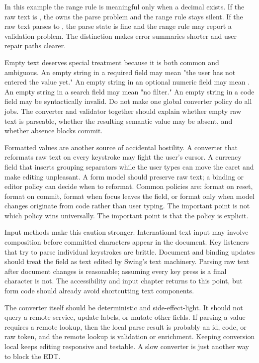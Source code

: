 In this example the range rule is meaningful only when a decimal exists. If the
raw text is , the  owns the parse problem and the
range rule stays silent. If the raw text parses to , the parse state is
fine and the range rule may report a validation problem. The distinction makes
error summaries shorter and user repair paths clearer.

Empty text deserves special treatment because it is both common and ambiguous.
An empty string in a required field may mean "the user has not entered the
value yet." An empty string in an optional numeric field may mean .
An empty string in a search field may mean "no filter." An empty string in a
code field may be syntactically invalid. Do not make one global converter
policy do all jobs. The converter and validator together should explain
whether empty raw text is parseable, whether the resulting semantic value may
be absent, and whether absence blocks commit.

Formatted values are another source of accidental hostility. A converter that
reformats raw text on every keystroke may fight the user's cursor. A currency
field that inserts grouping separators while the user types can move the caret
and make editing unpleasant. A form model should preserve raw text; a binding
or editor policy can decide when to reformat. Common policies are: format on
reset, format on commit, format when focus leaves the field, or format only
when model changes originate from code rather than user typing. The important
point is not which policy wins universally. The important point is that the
policy is explicit.

Input methods make this caution stronger. International text input may involve
composition before committed characters appear in the document. Key listeners
that try to parse individual keystrokes are brittle. Document and binding
updates should treat the field as text edited by Swing's text machinery.
Parsing raw text after document changes is reasonable; assuming every key press
is a final character is not. The accessibility and input chapter returns to
this point, but form code should already avoid shortcutting text components.

The converter itself should be deterministic and side-effect-light. It should
not query a remote service, update labels, or mutate other fields. If parsing a
value requires a remote lookup, then the local parse result is probably an id,
code, or raw token, and the remote lookup is validation or enrichment. Keeping
conversion local keeps editing responsive and testable. A slow converter is
just another way to block the EDT.

